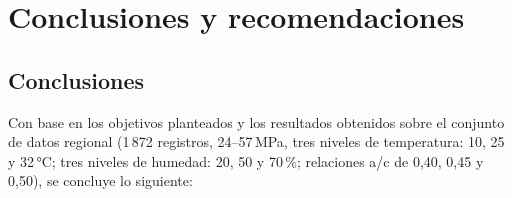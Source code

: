 \section{Conclusiones y recomendaciones}

\subsection{Conclusiones}

Con base en los objetivos planteados y los resultados obtenidos sobre el conjunto de datos regional (1\,872 registros, 24--57\,MPa, tres niveles de temperatura: 10, 25 y 32\,°C; tres niveles de humedad: 20, 50 y 70\,\%; relaciones a/c de 0{,}40, 0{,}45 y 0{,}50), se concluye lo siguiente:

